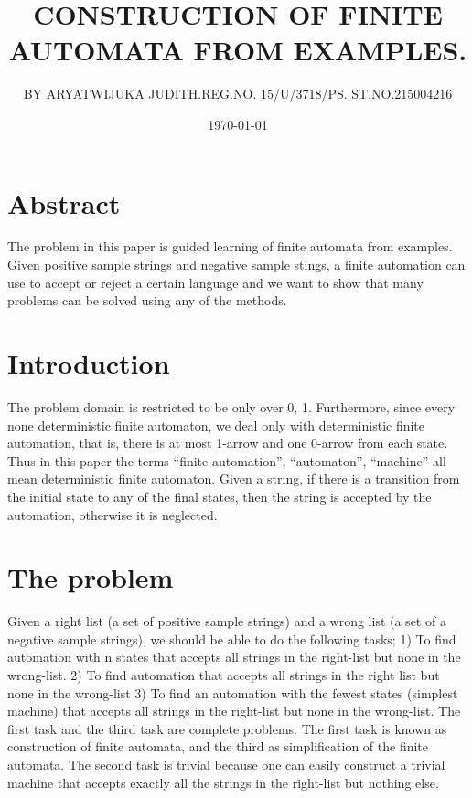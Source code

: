 \documentclass[14pt]{article}
\begin{document}
\title{CONSTRUCTION OF FINITE AUTOMATA FROM EXAMPLES.}

\author{BY ARYATWIJUKA JUDITH.REG.NO. 15/U/3718/PS. ST.NO.215004216}
\date{\today}

\section{Abstract}
The problem in this paper is guided learning of finite automata from examples. Given positive sample strings and negative sample stings, a finite automation can use to accept or reject a certain language and we want to show that many problems can be solved using any of the methods.
\section{Introduction}
The problem domain is restricted to be only over {0, 1}. Furthermore, since every none deterministic finite automaton, we deal only with deterministic finite automation, that is, there is at most 1-arrow and one 0-arrow from each state. Thus in this paper the terms “finite automation”, “automaton”, “machine” all mean deterministic finite automaton.
 Given a string, if there is a transition from the initial state to any of the final states, then the string is accepted by the automation, otherwise it is neglected.
\section{The problem}
Given a right list (a set of positive sample strings) and a wrong list (a set of a negative sample strings), we should be able to do the following tasks;
1)	To find automation with n states that accepts all strings in the right-list but none in the wrong-list.
2)	To find automation that accepts all strings in the right list but none in the wrong-list
3)	To find an automation with the fewest states (simplest machine) that accepts all strings in the right-list but none in the wrong-list.
The first task and the third task are complete problems. The first task is known as construction of finite automata, and the third as simplification of the finite automata.
The second task is trivial because one can easily construct a trivial machine that accepts exactly all the strings in the right-list but nothing else.
 
\end{document}
